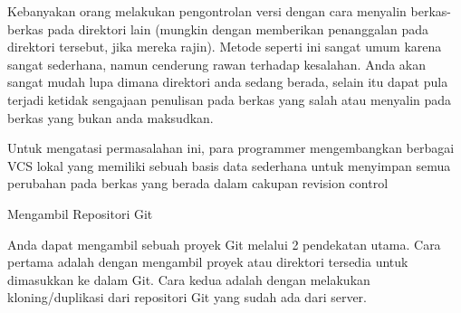  \par
\noindent 
{\fontsize{14pt}{14pt}\selectfont Kebanyakan orang melakukan pengontrolan versi dengan cara menyalin berkas-berkas pada direktori lain (mungkin dengan memberikan penanggalan pada direktori tersebut, jika mereka rajin). Metode seperti ini sangat umum karena sangat sederhana, namun cenderung rawan terhadap kesalahan. Anda akan sangat mudah lupa dimana direktori anda sedang berada, selain itu dapat pula terjadi ketidak sengajaan penulisan pada berkas yang salah atau menyalin pada berkas yang bukan anda maksudkan. \\} \par
\noindent 
{\fontsize{14pt}{14pt}\selectfont Untuk mengatasi permasalahan ini, para programmer mengembangkan berbagai VCS lokal yang memiliki sebuah basis data sederhana untuk menyimpan semua perubahan pada berkas yang berada dalam cakupan revision control \\} \par
\vspace{14pt}
\noindent 
{\fontsize{14pt}{14pt}\selectfont Mengambil Repositori Git \\} \par
\noindent 
{\fontsize{14pt}{14pt}\selectfont Anda dapat mengambil sebuah proyek Git melalui 2 pendekatan utama. Cara pertama adalah dengan mengambil proyek atau direktori tersedia untuk dimasukkan ke dalam Git. Cara kedua adalah dengan melakukan kloning/duplikasi dari repositori Git yang sudah ada dari server. \\} \par

